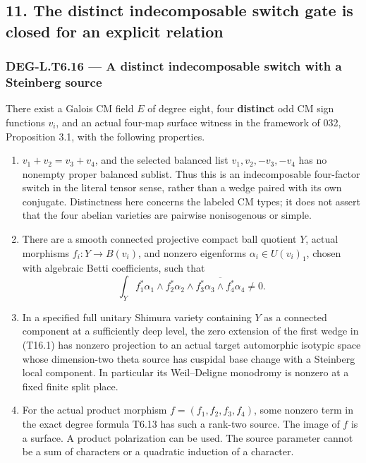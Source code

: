 \subsection{11. The distinct indecomposable switch gate is closed for an explicit relation}\label{the-distinct-indecomposable-switch-gate-is-closed-for-an-explicit-relation}

\subsubsection{DEG-L.T6.16 --- A distinct indecomposable switch with a Steinberg source}\label{DEG-L.T6.16}

There exist a Galois CM field \(E\) of degree eight, four \textbf{distinct} odd CM sign functions \(v_i\), and an actual four-map surface witness in the framework of 032, Proposition 3.1, with the following properties.

\begin{enumerate}
\def\labelenumi{\arabic{enumi}.}
\tightlist
\item
  \(v_1+v_2=v_3+v_4\), and the selected balanced list \(v_1,v_2,-v_3,-v_4\) has no nonempty proper balanced sublist. Thus this is an indecomposable four-factor switch in the literal tensor sense, rather than a wedge paired with its own conjugate. Distinctness here concerns the labeled CM types; it does not assert that the four abelian varieties are pairwise nonisogenous or simple.
\item
  There are a smooth connected projective compact ball quotient \(Y\), actual morphisms \(f_i:Y\to B(v_i)\), and nonzero eigenforms \(\alpha_i\in U(v_i)_1\), chosen with algebraic Betti coefficients, such that \[
  \int_Y f_1^*\alpha_1\wedge f_2^*\alpha_2
         \wedge\overline{f_3^*\alpha_3\wedge f_4^*\alpha_4}\ne0.
  \tag{T16.1}
  \]
\item
  In a specified full unitary Shimura variety containing \(Y\) as a connected component at a sufficiently deep level, the zero extension of the first wedge in (T16.1) has nonzero projection to an actual target automorphic isotypic space whose dimension-two theta source has cuspidal base change with a Steinberg local component. In particular its Weil--Deligne monodromy is nonzero at a fixed finite split place.
\item
  For the actual product morphism \(f=(f_1,f_2,f_3,f_4)\), some nonzero term in the exact degree formula T6.13 has such a rank-two source. The image of \(f\) is a surface. A product polarization can be used. The source parameter cannot be a sum of characters or a quadratic induction of a character.
\end{enumerate}

